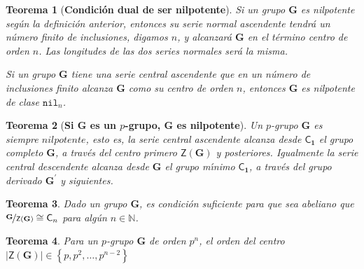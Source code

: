 \documentclass[final,12pt,a4paper,twoside,fleqn]{extbook}
\newcommand{\set}[1]{\ensuremath{\left\lbrace{#1}\right\rbrace}}
\newcommand{\setN}{\ensuremath{\mathds{N}}}
\newcommand{\grG}{\ensuremath{\mathbf{G}}}
\newcommand{\grclass}[1]{\ensuremath{\mathsf{#1}}}
\newcommand{\cyclicgr}[1]{\ensuremath{{\grclass{C}}_{#1}}}
\newcommand{\trivialgr}{\ensuremath{{\grclass{C}}_{\mathbf{1}}}}
\newcommand{\centro}[1]{\ensuremath{
        {\mathsf{Z}}
        {\left({#1}\right)}
}}
\newtheorem{thm}{Teorema}[chapter]
\theoremstyle{definition}
\theoremstyle{remark}
\begin{document}
\par
\begin{thm}[\textbf{Condici\'on dual de ser nilpotente}]
  \phantom{    }Si un grupo $\grG$ es \emph{nilpotente} según la definición anterior,
  entonces su \emph{serie normal ascendente} tendr\'a un número finito de inclusiones,
  digamos $n$, y alcanzará $\grG$ en el término centro de orden $n$. Las longitudes de las
  dos series normales ser\'a la misma.

  Si un grupo $\grG$ tiene una \emph{serie central ascendente} que en un n\'umero de
  inclusiones finito alcanza $\grG$ como su centro de orden $n$, entonces $\grG$ es nilpotente
  de clase $\mathtt{nil}_n$.
\end{thm}
\par
\begin{thm}[\textbf{Si $\grG$ es un $p$-grupo, $\grG$ es nilpotente}]
Un $p$-grupo $\grG$ es siempre $nilpotente$, esto es, la \emph{serie central ascendente}
alcanza desde $\trivialgr$ el grupo completo $\grG$, a través del centro primero $\centro{\grG}$
y posteriores. Igualmente la \emph{serie central descendente} alcanza desde $\grG$ el grupo
m{\'{\i}}nimo $\trivialgr$, a trav\'es del grupo derivado ${\grG}^{\prime}$ y siguientes.
\end{thm}
\par
\begin{thm}
Dado un grupo $\grG$, es condici\'on suficiente para que sea \emph{abeliano}
 que $\nicefrac{\grG}{\centro{\grG}}         \cong         \cyclicgr{n}$ para alg\'un $n         \in \setN$.
\end{thm}
\par
\begin{thm}
Para un $p$-grupo $\grG$ de orden ${p^n}$, el orden del centro
$\left|\mathsf{Z}\left({\grG}\right)\right|         \in \set{p,p^2,\ldots,p^{n-2}}$
\end{thm}
\par
\end{document}
